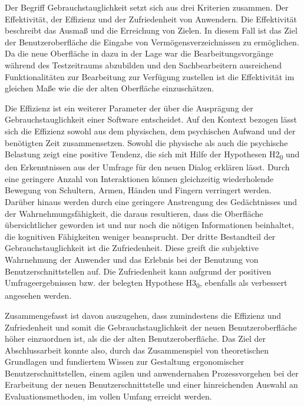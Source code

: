 Der Begriff Gebrauchstauglichkeit setzt sich aus drei Kriterien zusammen. Der Effektivität, der Effizienz und der Zufriedenheit von Anwendern. Die Effektivität beschreibt das Ausmaß und die Erreichung von Zielen. In diesem Fall ist das Ziel der Benutzeroberfläche die Eingabe von Vermögensverzeichnissen zu ermöglichen. Da die neue Oberfläche in dazu in der Lage war die Bearbeitungsvorgänge während des Testzeitraums abzubilden und den Sachbearbeitern ausreichend Funktionalitäten zur Bearbeitung zur Verfügung zustellen ist die Effektivität im gleichen Maße wie die der alten Oberfläche einzuschätzen.

Die Effizienz ist ein weiterer Parameter der über die Ausprägung der Gebrauchstauglichkeit einer Software entscheidet. Auf den Kontext bezogen lässt sich die Effizienz sowohl aus dem physischen, dem psychischen Aufwand und der benötigten Zeit zusammensetzen. Sowohl die physische als auch die psychische Belastung zeigt eine positive Tendenz, die sich mit Hilfe der Hypothesen H2\textsubscript{0} und den Erkenntnissen aus der Umfrage für den neuen Dialog erklären lässt. Durch eine geringere Anzahl von Interaktionen können gleichzeitig wiederholende Bewegung von Schultern, Armen, Händen und Fingern verringert werden. Darüber hinaus werden durch eine geringere Anstrengung des Gedächtnisses und der Wahrnehmungsfähigkeit, die daraus resultieren, dass die Oberfläche übersichtlicher geworden ist und nur noch die nötigen Informationen beinhaltet, die kognitiven Fähigkeiten weniger beansprucht. Der dritte Bestandteil der Gebrauchstauglichkeit ist die Zufriedenheit. Diese greift die subjektive Wahrnehmung der Anwender und das Erlebnis bei der Benutzung von Benutzerschnittstellen auf. Die Zufriedenheit kann aufgrund der positiven Umfrageergebnissen bzw. der belegten Hypothese H3\textsubscript{0}, ebenfalls als verbessert angesehen werden.

Zusammengefasst ist davon auszugehen, dass zumindestens die Effizienz und Zufriedenheit und somit die Gebrauchstauglichkeit der neuen Benutzeroberfläche höher einzuordnen ist, als die der alten Benutzeroberfläche. Das Ziel der Abschlussarbeit konnte also, durch das Zusammenspiel von theoretischen Grundlagen und fundiertem Wissen zur Gestaltung ergonomischer Benutzerschnittstellen, einem agilen und anwendernahen Prozessvorgehen bei der Erarbeitung der neuen Benutzerschnittstelle und einer hinreichenden Auswahl an Evaluationsmethoden, im vollen Umfang erreicht werden.